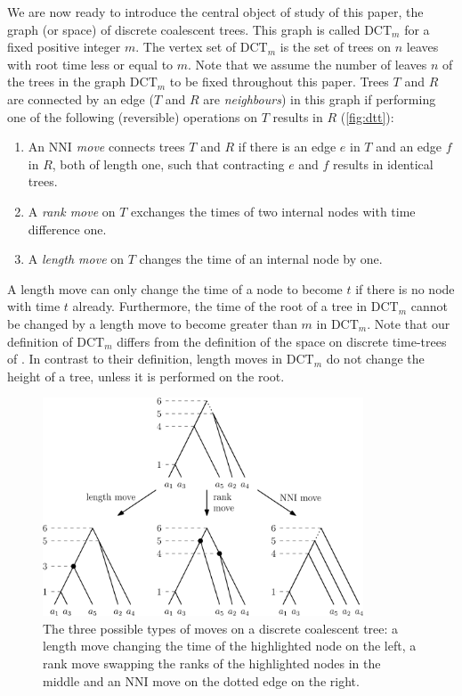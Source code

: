 \documentclass[11pt]{amsart}
\newcommand{\rnni}{\mathrm{RNNI}}
\newcommand{\nni}{\mathrm{NNI}}
\newcommand{\dct}{\mathrm{DCT}}
\newcommand{\summary}[1]{} %
\begin{document}
\summary{Defining the tree space $\dct_m$ and $\rnni = \dct_{n-1}$}
We are now ready to introduce the central object of study of this paper, the graph (or space) of discrete coalescent trees.
This graph is called $\dct_m$ for a fixed positive integer $m$.
The vertex set of $\dct_m$ is the set of trees on $n$ leaves with root time less or equal to $m$.
Note that we assume the number of leaves $n$ of the trees in the graph $\dct_m$ to be fixed throughout this paper.
Trees $T$ and $R$ are connected by an edge ($T$ and $R$ are \emph{neighbours}) in this graph if performing one of the following (reversible) operations on $T$ results in $R$ (\autoref{fig:dtt}):
\begin{enumerate}
	\item An \emph{$\nni$ move} connects trees $T$ and $R$ if there is an edge $e$ in $T$ and an edge $f$ in $R$, both of length one, such that contracting $e$ and $f$ results in identical trees.
	\item A \emph{rank move} on $T$ exchanges the times of two internal nodes with time difference one.
	\item A \emph{length move} on $T$ changes the time of an internal node by one.
\end{enumerate}
A length move can only change the time of a node to become $t$ if there is no node with time $t$ already.
Furthermore, the time of the root of a tree in $\dct_m$ cannot be changed by a length move to become greater than $m$ in $\dct_m$.
Note that our definition of $\dct_m$ differs from the definition of the space on discrete time-trees of \textcite{Gavryushkin2018-ol}.
In contrast to their definition, length moves in $\dct_m$ do not change the height of a tree, unless it is performed on the root.

\begin{figure}[ht]
	\includegraphics[width=0.85\textwidth]{dtt.eps}
	\caption{The three possible types of moves on a discrete coalescent tree: a length move changing the time of the highlighted node on the left, a rank move swapping the ranks of the highlighted nodes 	in the middle and an $\nni$ move on the dotted edge on the right.}
	\label{fig:dtt}
\end{figure}
\end{document}

